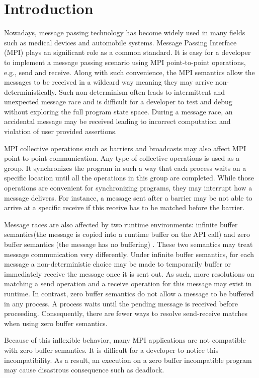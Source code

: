 \section{Introduction}
Nowadays, message passing technology has become widely used in many fields such as medical devices and automobile systems. Message Passing Interface (MPI) plays an significant role as a common standard. It is easy for a developer to implement a message passing scenario using MPI point-to-point operations, e.g., send and receive. Along with such convenience, the MPI semantics allow the messages to be received in a wildcard way meaning they may arrive non-deterministically. Such non-determinism often leads to intermittent and unexpected message race and is difficult for a developer to test and debug without exploring the full program state space. During a message race, an accidental message may be received leading to incorrect computation and violation of user provided assertions. 

MPI collective operations such as barriers and broadcasts may also affect MPI point-to-point communication. Any type of collective operations is used as a group. It synchronizes the program in such a way that each process waits on a specific location until all the operations in this group are completed. While those operations are convenient for synchronizing programs, they may interrupt how a message delivers. For instance, a message sent after a barrier may be not able to arrive at a specific receive if this receive has to be matched before the barrier. 
 
Message races are also affected by two runtime environments: infinite buffer semantics(the message is copied into a runtime buffer on the API call) and zero buffer semantics (the message has no buffering) \cite{DBLP:conf/fm/VakkalankaVGK09}. These two semantics may treat message communication very differently. Under infinite buffer semantics, for each message a non-deterministic choice may be made to temporarily buffer or immediately receive the message once it is sent out. As such, more resolutions on matching a send operation and a receive operation for this message may exist in runtime. In contrast, zero buffer semantics do not allow a message to be buffered in any process. A process waits until the pending message is received before proceeding. Consequently, there are fewer ways to resolve send-receive matches when using zero buffer semantics.

Because of this inflexible behavior, many MPI applications are not compatible with zero buffer semantics. It is difficult for a developer to notice this incompatibility. As a result, an execution on a zero buffer incompatible program may cause disastrous consequence such as deadlock. 

